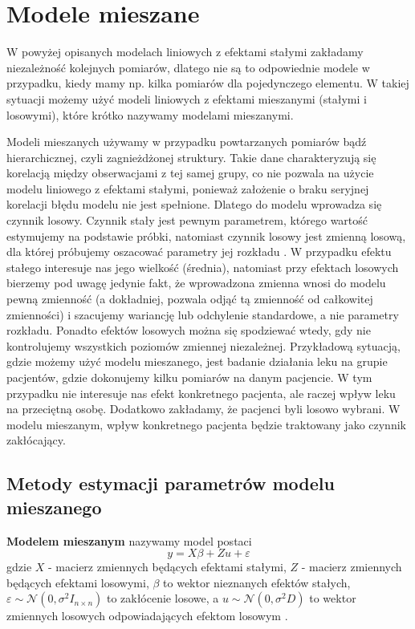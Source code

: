 \documentclass[12pt]{mwbk}
\theoremstyle{plain}
\theoremstyle{definition}
\theoremstyle{definition}
\begin{document}
\section{Modele mieszane} 
W powyżej opisanych modelach liniowych z efektami stałymi zakładamy niezależność kolejnych pomiarów, dlatego nie są to odpowiednie modele w przypadku, kiedy mamy np. kilka pomiarów dla pojedynczego elementu. W takiej sytuacji możemy użyć modeli liniowych z efektami mieszanymi (stałymi i losowymi), które krótko nazywamy modelami mieszanymi.

Modeli mieszanych używamy w przypadku powtarzanych pomiarów bądź hierarchicznej, czyli zagnieżdżonej struktury. Takie dane charakteryzują się korelacją między obserwacjami z tej samej grupy, co nie pozwala na użycie modelu liniowego z efektami stałymi, ponieważ założenie o braku seryjnej korelacji błędu modelu nie jest spełnione. Dlatego do modelu wprowadza się czynnik losowy.  Czynnik stały jest pewnym parametrem, którego wartość estymujemy na podstawie próbki, natomiast czynnik losowy jest zmienną losową, dla której próbujemy oszacować parametry jej rozkładu \cite{faraway}. W przypadku efektu stałego interesuje nas jego wielkość (średnia), natomiast przy efektach losowych bierzemy pod uwagę jedynie fakt, że wprowadzona zmienna wnosi do modelu pewną zmienność (a dokładniej, pozwala odjąć tą zmienność od całkowitej zmienności) i szacujemy wariancję lub odchylenie standardowe, a nie parametry rozkładu. Ponadto efektów losowych można się spodziewać wtedy, gdy nie kontrolujemy wszystkich poziomów zmiennej niezależnej. Przykładową sytuacją, gdzie możemy użyć modelu mieszanego, jest badanie działania leku na grupie pacjentów, gdzie dokonujemy kilku pomiarów na danym pacjencie. W tym przypadku nie interesuje nas efekt konkretnego pacjenta, ale raczej wpływ leku na przeciętną osobę. Dodatkowo zakładamy, że pacjenci byli losowo wybrani. W modelu mieszanym, wpływ konkretnego pacjenta będzie traktowany jako czynnik zakłócający.




\subsection{Metody estymacji parametrów modelu mieszanego}

\textbf{Modelem mieszanym} nazywamy model postaci
$$y=X\beta +Z u + \varepsilon$$
gdzie $X$ - macierz zmiennych będących efektami stałymi, $Z$ - macierz zmiennych będących efektami losowymi, $\beta$ to wektor nieznanych efektów stałych, $\varepsilon \sim \mathcal{N}(0, \sigma^2 I_{n\times n})$ to zakłócenie losowe, a $u \sim \mathcal{N} (0, \sigma^2D)$ to wektor zmiennych losowych odpowiadających efektom losowym \cite{biecek}.
\end{document}
